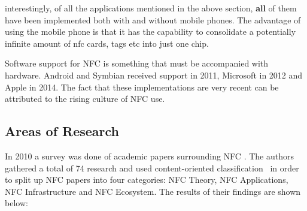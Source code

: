 interestingly, of all the applications mentioned in the above section, \textbf{all} of them have been implemented both with and without mobile phones. The advantage of using the mobile phone is that it has the capability to consolidate a potentially infinite amount of nfc cards, tags etc into just one chip.

Software support for NFC is something that must be accompanied with hardware. Android and Symbian received support in 2011, Microsoft in 2012 and Apple in 2014. The fact that these implementations are very recent can be attributed to the rising culture of NFC use. 

\subsection{Areas of Research}
In 2010 a survey was done of academic papers surrounding NFC \cite{nfctable}. The authors gathered a total of 74 research and used content-oriented classification~\cite{ngai2008rfid} in order to split up NFC papers into four categories: NFC Theory, NFC Applications, NFC Infrastructure and NFC Ecosystem. The results of their findings are shown below:
